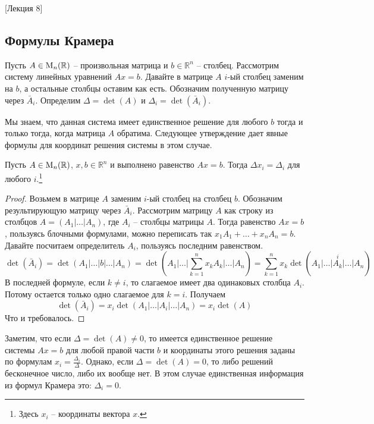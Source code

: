 [Лекция 8]



\subsection{Формулы Крамера}

Пусть $A\in\operatorname{M}_{n}(\mathbb R)$ -- произвольная матрица и $b\in\mathbb R^n$ -- столбец. Рассмотрим систему линейных уравнений $Ax = b$. Давайте в матрице $A$ $i$-ый столбец заменим на $b$, а остальные столбцы оставим как есть. Обозначим полученную матрицу через $\bar A_i$. Определим $\Delta = \det (A)$ и $\Delta_i = \det (\bar A_i)$.

Мы знаем, что данная система имеет единственное решение для любого $b$ тогда и только тогда, когда матрица $A$ обратима. Следующее утверждение дает явные формулы для координат решения системы в этом случае.

\begin{claim}
Пусть $A\in\operatorname{M}_{n}(\mathbb R)$, $x,b\in \mathbb R^n$ и выполнено равенство $Ax = b$. Тогда $\Delta x_i = \Delta_i$ для любого $i$.\footnote{Здесь $x_i$ -- координаты вектора $x$.}
\end{claim}
\begin{proof}
Возьмем в матрице $A$ заменим $i$-ый столбец на столбец $b$. Обозначим результирующую матрицу через $\bar A_i$. Рассмотрим матрицу $A$ как строку из столбцов $A = (A_1|\ldots|A_n)$, где $A_i$ -- столбцы матрицы $A$. Тогда равенство $Ax = b$, пользуясь блочными формулами, можно переписать так $x_1 A_1 + \ldots + x_n A_n = b$. Давайте посчитаем определитель $A_i$, пользуясь последним равенством. 
\[
\det (\bar A_i) = \det(A_1|\ldots|b|\ldots|A_n) = \det(A_1|\ldots|\sum_{k=1}^n x_k A_k|\ldots|A_n) = \sum_{k=1}^n x_k \det (
\stackrel{i}{A_1|\ldots|A_k|\ldots|A_n})
\]
В последней формуле, если $k\neq i$, то слагаемое имеет два одинаковых столбца $A_i$. Потому остается только одно слагаемое для $k = i$. Получаем
\[
\det(\bar A_i) = x_i \det(A_1|\ldots|A_i|\ldots|A_n) = x_i \det(A)
\]
Что и требовалось.
\end{proof}

Заметим, что если $\Delta = \det (A) \neq 0$, то имеется единственное решение системы $Ax = b$ для любой правой части $b$ и координаты этого решения заданы по формулам $x_i =\frac{\Delta_i}{\Delta}$. Однако, если $\Delta = \det(A) = 0$, то либо решений бесконечное число, либо их вообще нет. В этом случае единственная информация из формул Крамера это: $\Delta_i = 0$.


